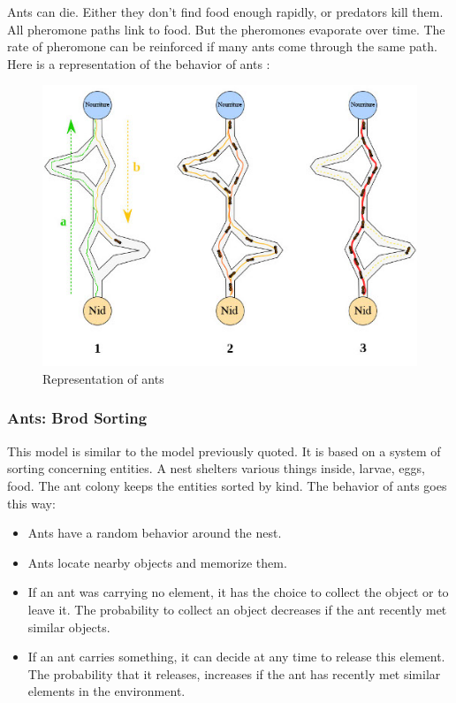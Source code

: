Ants can die. Either they don't find food enough rapidly, or predators kill them.\\
All pheromone paths link to food. But the pheromones evaporate over time. The rate of pheromone can be reinforced if many ants come through the same path.\\
Here is a representation of the behavior of ants :

\begin{figure}[h]
\center
\includegraphics{../images/SchemaFourmi.png}
\caption{\label{AntsRepresentation} Representation of ants\cite{RepresentationOfAnts}}
\end{figure}

\newpage

\subsubsection{Ants: Brod Sorting}

This model is similar to the model previously quoted. It is based on a system of sorting concerning entities. A nest shelters various things inside, larvae, eggs, food. The ant colony keeps the entities sorted by kind.
The behavior of ants goes this way:

\begin{itemize}
\item Ants have a random behavior around the nest.
\item Ants locate nearby objects and memorize them.
\item If an ant was carrying no element, it has the choice to collect the object or to leave it. The probability to collect an object decreases if the ant recently met similar objects.
\item If an ant carries something, it can decide at any time to release this element. The probability that it releases, increases if the ant has recently met similar elements in the environment.
\end{itemize}

